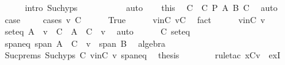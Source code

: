 \begin{isabellebody}
\ \ \ \ \isamarkupfalse%
\ {\isacharparenleft}intro\ Suc{\isachardot}hyps{\isacharparenleft}{}{\isacharparenright}{\isacharparenright}\isanewline
\ \ \ \ \ \ \ \ \ \isamarkupfalse%
\ auto\isanewline
\ \ \isamarkupfalse%
\ this\ \isamarkupfalse%
\ C{\isacharprime}\ \ C{\isacharprime}{\isacharcolon}\ {\isachardoublequoteopen}{\isacharquery}P\ {\isacharquery}A{\isacharprime}\ B\ C{\isacharprime}{\isachardoublequoteclose}\ \isamarkupfalse%
\ auto\isanewline
\isanewline
\ \ \isamarkupfalse%
\ {\isacharquery}case\ \isanewline
\ \ \isamarkupfalse%
\ {\isacharparenleft}cases\ {\isachardoublequoteopen}v{\isasymin}\ C{\isacharprime}{\isachardoublequoteclose}{\isacharparenright}\isanewline
\ \ \ \ \isamarkupfalse%
\ True\isanewline
\ \ \ \ \isamarkupfalse%
\ vinC{\isacharprime}{\isacharcolon}\ {\isachardoublequoteopen}v{\isasymin}C{\isacharprime}{\isachardoublequoteclose}\ \isamarkupfalse%
\ fact\isanewline
\ \ \ \ \isamarkupfalse%
\ vinC{\isacharprime}\ v\ \isamarkupfalse%
\ seteq{\isacharcolon}\ {\isachardoublequoteopen}A\ {\isacharminus}\ {\isacharbraceleft}v{\isacharbraceright}\ {\isasymunion}\ C{\isacharprime}\ {\isacharequal}\ A\ {\isasymunion}\ {\isacharparenleft}C{\isacharprime}\ {\isacharminus}\ {\isacharbraceleft}v{\isacharbraceright}{\isacharparenright}{\isachardoublequoteclose}\ \isamarkupfalse%
\ auto\isanewline
\ \ \ \ \isamarkupfalse%
\ C{\isacharprime}\ seteq\ \isamarkupfalse%
\ spaneq{\isacharcolon}\ {\isachardoublequoteopen}span\ {\isacharparenleft}A\ {\isasymunion}\ {\isacharparenleft}C{\isacharprime}\ {\isacharminus}\ {\isacharbraceleft}v{\isacharbraceright}{\isacharparenright}{\isacharparenright}\ {\isacharequal}\ span\ {\isacharparenleft}B{\isacharparenright}{\isachardoublequoteclose}\ \isamarkupfalse%
\ algebra\isanewline
\ \ \ \ \isamarkupfalse%
\ Suc{\isachardot}prems\ Suc{\isachardot}hyps\ C{\isacharprime}\ vinC{\isacharprime}\ v\ spaneq\ \isamarkupfalse%
\ {\isacharquery}thesis\isanewline
\ \ \ \ \ \ \isamarkupfalse%
\ {\isacharparenleft}rule{\isacharunderscore}tac\ x{\isacharequal}{\isachardoublequoteopen}C{\isacharprime}{\isacharminus}{\isacharbraceleft}v{\isacharbraceright}{\isachardoublequoteclose}\ \ exI{\isacharparenright}\isanewline
\ \ \ \ \ \ \isamarkupfalse%

\end{isabellebody}
